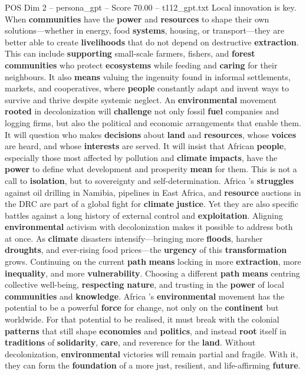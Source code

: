 \begin{textsample}{POS Dim 2 – persona\_gpt – Score 70.00 – t112\_gpt.txt}
Local innovation is key.
When \textbf{communities} have the \textbf{power} and \textbf{resources} to shape their own solutions—whether in energy, food \textbf{systems}, housing, or transport—they are better able to create \textbf{livelihoods} that do not depend on destructive \textbf{extraction}.
This can include \textbf{supporting} small-scale farmers, fishers, and \textbf{forest} \textbf{communities} who protect \textbf{ecosystems} while feeding and \textbf{caring} for their neighbours.
It also \textbf{means} valuing the ingenuity found in informal settlements, markets, and cooperatives, where \textbf{people} constantly adapt and invent ways to survive and thrive despite systemic neglect.
An \textbf{environmental} movement \textbf{rooted} in decolonization will \textbf{challenge} not only fossil \textbf{fuel} companies and logging firms, but also the political and economic arrangements that enable them.
It will question who makes \textbf{decisions} about \textbf{land} and \textbf{resources}, whose \textbf{voices} are heard, and whose \textbf{interests} are served.
It will insist that African \textbf{people}, especially those most affected by pollution and \textbf{climate} \textbf{impacts}, have the \textbf{power} to define what development and prosperity \textbf{mean} for them.
This is not a call to \textbf{isolation}, but to sovereignty and self-determination.
Africa ’s \textbf{struggles} against oil drilling in Namibia, pipelines in East Africa, and \textbf{resource} auctions in the DRC are part of a global fight for \textbf{climate} \textbf{justice}.
Yet they are also specific battles against a long history of external control and \textbf{exploitation}.
Aligning \textbf{environmental} activism with decolonization makes it possible to address both at once.
As \textbf{climate} disasters intensify—bringing more \textbf{floods}, harsher \textbf{droughts}, and ever-rising food prices—the \textbf{urgency} of this \textbf{transformation} grows.
Continuing on the current \textbf{path} \textbf{means} locking in more \textbf{extraction}, more \textbf{inequality}, and more \textbf{vulnerability}.
Choosing a different \textbf{path} \textbf{means} centring collective well-being, \textbf{respecting} \textbf{nature}, and trusting in the \textbf{power} of local \textbf{communities} and \textbf{knowledge}.
Africa ’s \textbf{environmental} movement has the potential to be a powerful \textbf{force} for change, not only on the \textbf{continent} but worldwide.
For that potential to be realised, it must break with the colonial \textbf{patterns} that still shape \textbf{economies} and \textbf{politics}, and instead \textbf{root} itself in \textbf{traditions} of \textbf{solidarity}, \textbf{care}, and reverence for the \textbf{land}.
Without decolonization, \textbf{environmental} victories will remain partial and fragile.
With it, they can form the \textbf{foundation} of a more just, resilient, and life-affirming \textbf{future}.


\end{textsample}
